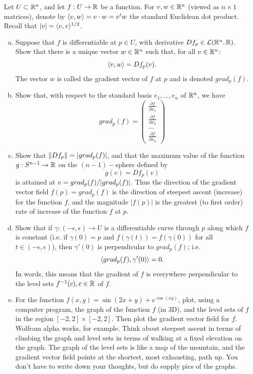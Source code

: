 \documentclass[a4paper, 12pt]{article}
\begin{document}
\begin{problem} 
Let $U \subset \mathbb{R}^n$, and let $f: U \to \mathbb{R}$ be a function. For $v, w \in \mathbb{R}^n$ (viewed as $n \times 1$ matrices), denote by $\langle v, w \rangle = v \cdot w = v^tw$ the standard Euclidean dot product. Recall that $|v| = \langle v, v \rangle^{1/2}$.
\begin{enumerate} [(a)]
    \item Suppose that $f$ is differentiable at $p \in U$, with derivative $Df_p \in \mathcal{L}(\mathbb{R}^n, \mathbb{R})$. Show that there is a unique vector $w \in \mathbb{R}^n$ such that, for all $v \in \mathbb{R}^n$: \[
              \langle v, w \rangle = Df_p(v).
          \]
          The vector $w$ is called the gradient vector of $f$ at $p$ and is denoted $grad_p(f)$.
    \item Show that, with respect to the standard basis $e_1, \dots, e_n$ of $\mathbb{R}^n$, we have \[
              grad_p(f) = \begin{pmatrix}
                  \frac{\partial f}{\partial x_1} \\
                  \frac{\partial f}{\partial x_2} \\
                  \dots                           \\
                  \frac{\partial f}{\partial x_n}
              \end{pmatrix}
          \]
    \item Show that $\lVert Df_p\rVert = \lvert grad_p(f)\rvert$, and that the maximum value of the function $g: S^{n-1} \to \mathbb{R}$ on the $(n-1)-$sphere defined by \[
              g(v) = Df_p(v)
          \]
          is attained at $v = grad_p(f)/\lvert grad_p(f)\rvert$. Thus the direction of the gradient vector field $f(p) = grad_p(f)$ is the direction of steepest ascent (increase) for the function $f$, and the magnitude $|f(p)|$ is the greatest (to first order) rate of increase of the function $f$ at $p$.
    \item Show that if $\gamma: (-\epsilon , \epsilon) \to U$ is a differentiable curve through $p$ along which $f$ is constant (i.e. if $\gamma (0) = p$ and $f(\gamma(t)) = f(\gamma(0))$ for all $t \in (-\epsilon, \epsilon)$), then $\gamma'(0)$ is perpendicular to $grad_p(f)$; i.e. \[
              \langle grad_p(f), \gamma'(0) \rangle = 0.
          \]
          In words, this means that the gradient of $f$ is everywhere perpendicular to the level sets $f^{-1}(c), c \in \mathbb{R}$ of $f$.
    \item For the function $f(x, y) = \sin(2x+y) + e^{\cos(xy)}$, plot, using a computer program, the graph of the function $f$ (in 3D), and the level sets of $f$ in the region $[-2, 2] \times [-2, 2]$. Then plot the gradient vector ﬁeld for $f$. Wolfram alpha works, for example. Think about steepest ascent in terms of climbing the graph and level sets in terms of walking at a ﬁxed elevation on the graph. The graph of the level sets is like a map of the mountain, and the gradient vector ﬁeld points at the shortest, most exhausting, path up. You don't have to write down your thoughts, but do supply pics of the graphs.


\end{enumerate}
\end{problem}
\end{document}

